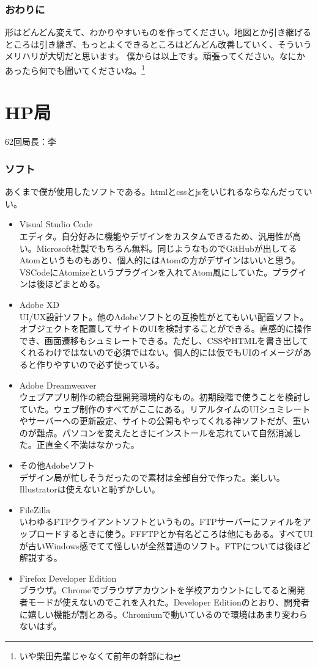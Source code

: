 \documentclass[dvipdfmx,jb5]{jarticle}
\begin{document}
\section{おわりに}
形はどんどん変えて、わかりやすいものを作ってください。地図とか引き継げるところは引き継ぎ、もっとよくできるところはどんどん改善していく、そういうメリハリが大切だと思います。
僕からは以上です。頑張ってください。なにかあったら何でも聞いてくださいね。\footnote{いや柴田先輩じゃなくて前年の幹部にね}

 \newpage
  \part{HP局}
 62回局長：李
 \section{ソフト}
 あくまで僕が使用したソフトである。htmlとcssとjsをいじれるならなんだっていい。
  \begin{itemize}
  \item Visual Studio Code\\
  エディタ。自分好みに機能やデザインをカスタムできるため、汎用性が高い。Microsoft社製でもちろん無料。同じようなものでGitHubが出してるAtomというものもあり、個人的にはAtomの方がデザインはいいと思う。VSCodeにAtomizeというプラグインを入れてAtom風にしていた。プラグインは後ほどまとめる。
  \item Adobe XD\\
  UI/UX設計ソフト。他のAdobeソフトとの互換性がとてもいい配置ソフト。オブジェクトを配置してサイトのUIを検討することができる。直感的に操作でき、画面遷移もシュミレートできる。ただし、CSSやHTMLを書き出してくれるわけではないので必須ではない。個人的には仮でもUIのイメージがあると作りやすいので必ず使っている。
  \item Adobe Dreamweaver\\
  ウェブアプリ制作の統合型開発環境的なもの。初期段階で使うことを検討していた。ウェブ制作のすべてがここにある。リアルタイムのUIシュミレートやサーバーへの更新設定、サイトの公開もやってくれる神ソフトだが、重いのが難点。パソコンを変えたときにインストールを忘れていて自然消滅した。正直全く不満はなかった。
  \item その他Adobeソフト\\
  デザイン局が忙しそうだったので素材は全部自分で作った。楽しい。Illustratorは使えないと恥ずかしい。
  \item FileZilla\\
  いわゆるFTPクライアントソフトというもの。FTPサーバーにファイルをアップロードするときに使う。FFFTPとか有名どころは他にもある。すべてUIが古いWindows感でてて怪しいが全然普通のソフト。FTPについては後ほど解説する。
  \item Firefox Developer Edition\\
  ブラウザ。Chromeでブラウザアカウントを学校アカウントにしてると開発者モードが使えないのでこれを入れた。Developer Editionのとおり、開発者に嬉しい機能が割とある。Chromiumで動いているので環境はあまり変わらないはず。
 \end{itemize}
\end{document}
